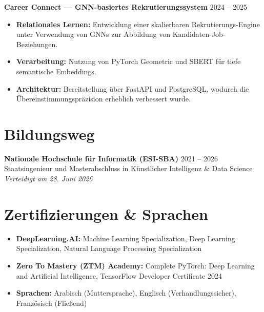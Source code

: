 \documentclass[a4paper,10pt]{article}
\begin{document}
\vspace{6pt}
\noindent\textbf{Career Connect --- GNN-basiertes Rekrutierungssystem} \hfill 2024 -- 2025 \\
\begin{itemize}
    \item \textbf{Relationales Lernen:} Entwicklung einer skalierbaren Rekrutierungs-Engine unter Verwendung von GNNs zur Abbildung von Kandidaten-Job-Beziehungen.
    \item \textbf{Verarbeitung:} Nutzung von PyTorch Geometric und SBERT für tiefe semantische Embeddings.
    \item \textbf{Architektur:} Bereitstellung über FastAPI und PostgreSQL, wodurch die Übereinstimmungspräzision erheblich verbessert wurde.
\end{itemize}

\section{Bildungsweg}
\textbf{Nationale Hochschule für Informatik (ESI-SBA)} \hfill 2021 -- 2026 \\
Staatsingenieur und Masterabschluss in Künstlicher Intelligenz \& Data Science \\
\textit{Verteidigt am 28. Juni 2026}

\section{Zertifizierungen \& Sprachen}
\begin{itemize}[label=--]
    \item \textbf{DeepLearning.AI:} Machine Learning Specialization, Deep Learning Specialization, Natural Language Processing Specialization
    \item \textbf{Zero To Mastery (ZTM) Academy:} Complete PyTorch: Deep Learning and Artificial Intelligence, TensorFlow Developer Certificate 2024
    \item \textbf{Sprachen:} Arabisch (Muttersprache), Englisch (Verhandlungssicher), Französisch (Fließend)
\end{itemize}
\end{document}
